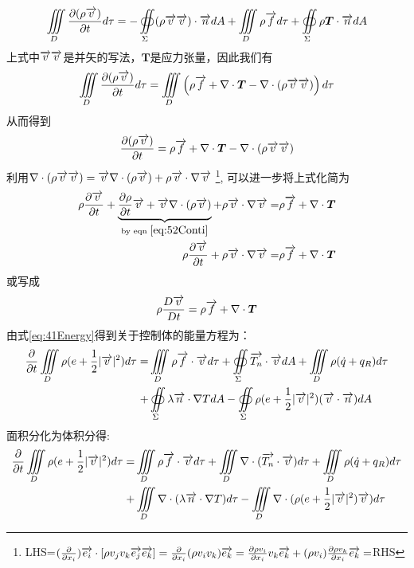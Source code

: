 \begin{equation}
\iiint\limits_{D}\frac{\partial (\rho\overrightarrow{v})}{\partial t} d\tau =- \oiint\limits_{\Sigma} (\rho\overrightarrow{v}\overrightarrow{v})\cdot \overrightarrow{n} dA +
\iiint\limits_{D} \rho \overrightarrow{f} d\tau + 
\oiint\limits_{\Sigma} \rho \bm{T}\cdot\overrightarrow{n} dA
\end{equation}
上式中$\overrightarrow{v}\overrightarrow{v}$是并矢的写法，$\bm{T}$是应力张量，因此我们有
\begin{equation}
\iiint\limits_{D} \frac{\partial (\rho\overrightarrow{v})}{\partial t}d\tau=
\iiint\limits_{D} \left(\rho\overrightarrow{f}+\nabla\cdot\bm{T}-\nabla\cdot(\rho\overrightarrow{v}\overrightarrow{v})\right)d\tau
\end{equation}
从而得到
\begin{equation}
 \frac{\partial (\rho\overrightarrow{v})}{\partial t}=\rho\overrightarrow{f}+\nabla\cdot\bm{T}-\nabla\cdot(\rho\overrightarrow{v}\overrightarrow{v})
 \end{equation}
利用$\nabla\cdot(\rho\overrightarrow{v}\overrightarrow{v})=\overrightarrow{v}\nabla\cdot(\rho\overrightarrow{v})+\rho\overrightarrow{v}\cdot\nabla\overrightarrow{v}$
\footnote{
LHS=$(\frac{\partial}{\partial x_i})\overrightarrow{e_i}\cdot[\rho v_jv_k\overrightarrow{e_j}\overrightarrow{e_k}]
=\frac{\partial}{\partial x_i}(\rho v_iv_k)\overrightarrow{e_k}
=\frac{\partial \rho v_i}{\partial x_i}v_k\overrightarrow{e_k}+(\rho v_i)\frac{\partial \rho v_k}{\partial x_i}\overrightarrow{e_k}
=$RHS
},
可以进一步将上式化简为
\begin{align}\notag
 \rho\frac{\partial \overrightarrow{v}}{\partial t}+\underbrace{\frac{\partial \rho}{\partial t}\overrightarrow{v}+\overrightarrow{v}\nabla\cdot(\rho\overrightarrow{v})}_{\text{by eqn }\eqref{eq:52Conti}}+\rho\overrightarrow{v}\cdot\nabla\overrightarrow{v}=&\rho\overrightarrow{f}+\nabla\cdot\bm{T}\\
 \rho\frac{\partial \overrightarrow{v}}{\partial t}+\rho\overrightarrow{v}\cdot\nabla\overrightarrow{v}=&\rho\overrightarrow{f}+\nabla\cdot\bm{T}\label{eq:52Momen}
 \end{align}
或写成
\begin{equation}\label{eq:52momen}
\rho\frac{D \overrightarrow{v}}{D t}=\rho \overrightarrow{f} + \nabla \cdot \bm{T}
\end{equation}
由式\eqref{eq:41Energy}得到关于控制体的能量方程为：
\begin{align}\notag
\frac{\partial}{\partial t}\iiint\limits_{D} \rho(e+\frac{1}{2}|\overrightarrow{v}|^2) d\tau =& \iiint\limits_{D} \rho \overrightarrow{f}\cdot\overrightarrow{v} d\tau + 
\oiint\limits_{\Sigma}  \overrightarrow{T_n}\cdot\overrightarrow{v} dA + \iiint\limits_{D}\rho (\dot{q}+q_R)d\tau \\
+&\oiint\limits_{\Sigma} \lambda \overrightarrow{n}\cdot \nabla T dA-\oiint\limits_{\Sigma}\rho(e+\frac{1}{2}|\overrightarrow{v}|^2)(\overrightarrow{v}\cdot\overrightarrow{n})dA
\end{align}
面积分化为体积分得:
\begin{align}\notag
\frac{\partial}{\partial t}\iiint\limits_{D} \rho(e+\frac{1}{2}|\overrightarrow{v}|^2) d\tau =& 
\iiint\limits_{D} \rho \overrightarrow{f}\cdot\overrightarrow{v} d\tau + 
\iiint\limits_{D}  \nabla\cdot(\overrightarrow{T_n}\cdot\overrightarrow{v}) d\tau + 
\iiint\limits_{D}\rho (\dot{q}+q_R)d\tau \\
+&\iiint\limits_{D} \nabla\cdot(\lambda \overrightarrow{n}\cdot \nabla T) d\tau-
\iiint\limits_{D}\nabla\cdot(\rho(e+\frac{1}{2}|\overrightarrow{v}|^2)\overrightarrow{v})d\tau
\end{align}
